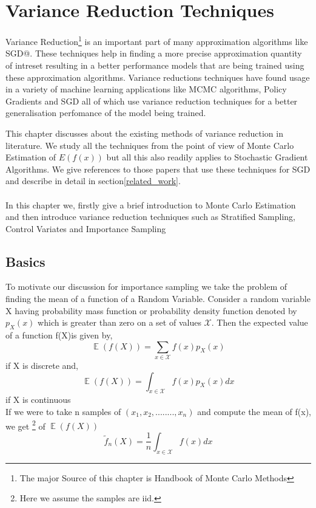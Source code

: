 \documentclass[a4paper,twoside]{iiththesis}
\theoremstyle{definition}
\theoremstyle{definition}
\theoremstyle{remark}
\DeclareMathOperator*{\E}{\mathop{\mathbb{E}}}
\begin{document}
\chapter{Variance Reduction Techniques}

Variance Reduction\footnote{The major Source of this chapter is Handbook of Monte Carlo Methods} is an important part of many approximation algorithms like SGD@. These techniques help in finding a more precise approximation quantity of intreset resulting in a better performance models that are being trained using these approximation algorithms. Variance reductions techniques have found usage in a variety of machine learning applications like MCMC algorithms, Policy Gradients and SGD all of which use variance reduction techniques for a better generalisation perfomance of the model being trained. 

This chapter discusses about the existing methods of variance reduction in literature. We study all the techniques from the point of view of Monte Carlo Estimation of $E(f(x))$ but all this also readily applies to Stochastic Gradient Algorithms. We give references to those papers that use these techniques for SGD and describe in detail in section\ref{related_work}. \\ \\
In this chapter we, firstly give a brief introduction to Monte Carlo Estimation and then introduce variance reduction techniques such as Stratified Sampling, Control Variates and Importance Sampling


\section{Basics}
To motivate our discussion for importance sampling we take the problem of finding the mean of a function of a Random Variable. 
Consider a random variable X having probability mass function or probability density function denoted by $p_X(x)$ which is greater than zero on a set of values $\mathcal{X}$. Then the expected value of a function f(X)is given by, 
\begin{equation}
\E (f(X)) = \sum_{x\in\mathcal{X}} f(x) p_{X}(x)
\end{equation}
if X is discrete and, 
\begin{equation}
\E (f(X)) = \int_{x\in\mathcal{X}} f(x) p_{X}(x) dx
\end{equation}
if X is continuous \\
If we were to take n samples of $(x_1, x_2, ........, x_n)$ and compute the mean of f(x), we get \footnote{\label{Basics} Here we assume the samples are iid.} of $\E (f(X))$\begin{equation}
	\widetilde{f}_{n} (X) = \frac{1}{n} \int_{x\in\mathcal{X}} f(x)dx
      \end{equation}
\end{document}
